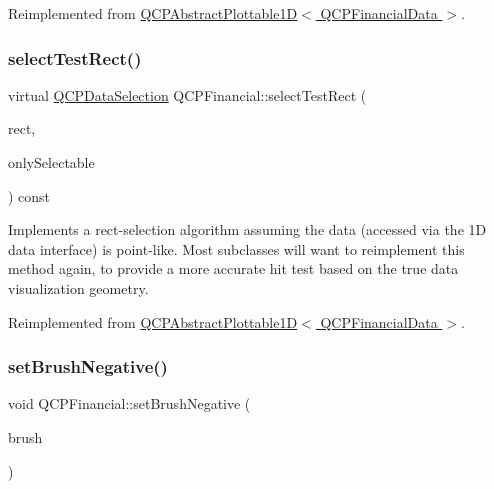Reimplemented from \hyperlink{class_q_c_p_abstract_plottable1_d_ac385c38a79e419ed3600c2ee398fd216}{Q\+C\+P\+Abstract\+Plottable1\+D$<$ Q\+C\+P\+Financial\+Data $>$}.

\mbox{\label{class_q_c_p_financial_a2d7c9beec376fed78a6091a17f59eb1e}} 
\subsubsection{\texorpdfstring{select\+Test\+Rect()}{selectTestRect()}\hspace{0.1cm}{\footnotesize\ttfamily [2/2]}}
{\footnotesize\ttfamily virtual \hyperlink{class_q_c_p_data_selection}{Q\+C\+P\+Data\+Selection} Q\+C\+P\+Financial\+::select\+Test\+Rect (\begin{DoxyParamCaption}\item[{const Q\+RectF \&}]{rect,  }\item[{bool}]{only\+Selectable }\end{DoxyParamCaption}) const\hspace{0.3cm}{\ttfamily [virtual]}}

Implements a rect-\/selection algorithm assuming the data (accessed via the 1D data interface) is point-\/like. Most subclasses will want to reimplement this method again, to provide a more accurate hit test based on the true data visualization geometry.

Reimplemented from \hyperlink{class_q_c_p_abstract_plottable1_d_ac385c38a79e419ed3600c2ee398fd216}{Q\+C\+P\+Abstract\+Plottable1\+D$<$ Q\+C\+P\+Financial\+Data $>$}.

\mbox{\label{class_q_c_p_financial_a8bbdd87629f9144b3ef51af660c0961a}} 
\subsubsection{\texorpdfstring{set\+Brush\+Negative()}{setBrushNegative()}}
{\footnotesize\ttfamily void Q\+C\+P\+Financial\+::set\+Brush\+Negative (\begin{DoxyParamCaption}\item[{const Q\+Brush \&}]{brush }\end{DoxyParamCaption})}

